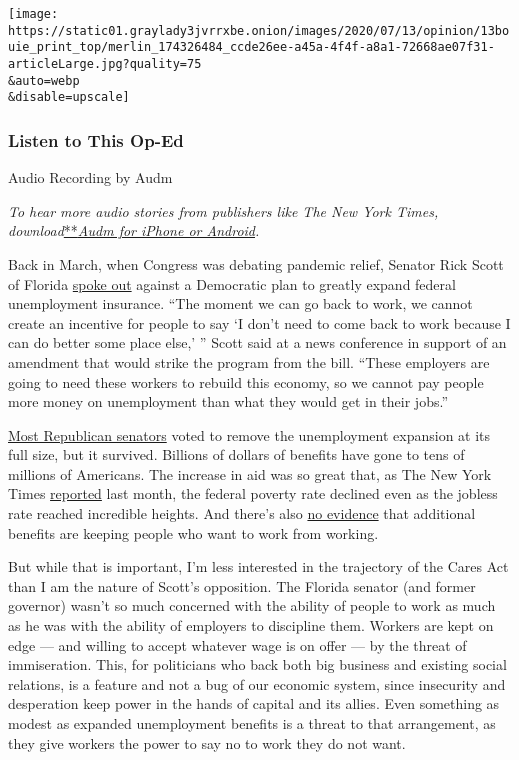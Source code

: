\texttt{[image: https://static01.graylady3jvrrxbe.onion/images/2020/07/13/opinion/13bouie\_print\_top/merlin\_174326484\_ccde26ee-a45a-4f4f-a8a1-72668ae07f31-articleLarge.jpg?quality=75\\\&auto=webp\\\&disable=upscale]}

\hypertarget{listen-to-this-op-ed}{%
\subsubsection{Listen to This Op-Ed}\label{listen-to-this-op-ed}}

Audio Recording by Audm

\emph{To hear more audio stories from publishers like The New York
Times,
download}\href{https://www.audm.com/?utm_source=nytmag\&utm_medium=embed\&utm_campaign=left_behind_draper}{**}\href{https://www.audm.com/?utm_source=nytopinion\&utm_medium=embed\&utm_campaign=trump_see_you}{\emph{Audm
for iPhone or Android}}\emph{.}

Back in March, when Congress was debating pandemic relief, Senator Rick
Scott of Florida
\href{https://twitter.com/thehill/status/1242894562823151616?s=21}{spoke
out} against a Democratic plan to greatly expand federal unemployment
insurance. ``The moment we can go back to work, we cannot create an
incentive for people to say `I don't need to come back to work because I
can do better some place else,' '' Scott said at a news conference in
support of an amendment that would strike the program from the bill.
``These employers are going to need these workers to rebuild this
economy, so we cannot pay people more money on unemployment than what
they would get in their jobs.''

\href{https://thehill.com/homenews/senate/489589-senate-rejects-gop-attempt-to-change-unemployment-benefits-in-stimulus-bill}{Most
Republican senators} voted to remove the unemployment expansion at its
full size, but it survived. Billions of dollars of benefits have gone to
tens of millions of Americans. The increase in aid was so great that, as
The New York Times
\href{https://www.nytimes3xbfgragh.onion/2020/06/21/us/politics/coronavirus-poverty.html\#click=https://t.co/6LfQmIUQ2G}{reported}
last month, the federal poverty rate declined even as the jobless rate
reached incredible heights. And there's also
\href{https://www.cnbc.com/2020/06/25/people-receiving-unemployment-benefits-are-more-likely-to-look-for-jobs.html}{no
evidence} that additional benefits are keeping people who want to work
from working.

But while that is important, I'm less interested in the trajectory of
the Cares Act than I am the nature of Scott's opposition. The Florida
senator (and former governor) wasn't so much concerned with the ability
of people to work as much as he was with the ability of employers to
discipline them. Workers are kept on edge --- and willing to accept
whatever wage is on offer --- by the threat of immiseration. This, for
politicians who back both big business and existing social relations, is
a feature and not a bug of our economic system, since insecurity and
desperation keep power in the hands of capital and its allies. Even
something as modest as expanded unemployment benefits is a threat to
that arrangement, as they give workers the power to say no to work they
do not want.

